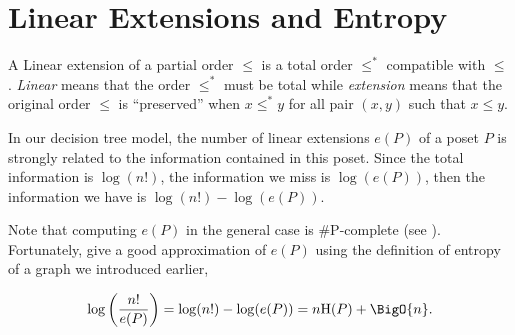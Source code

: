 \section{Linear Extensions and Entropy}

A Linear extension of a partial order $\leq$ is a total order $\leq^*$
compatible with $\leq$. \emph{Linear} means that the order $\leq^*$ must be
total while \emph{extension} means that the original order $\leq$ is
``preserved'' \ie when \(x \leq^* y\) for all pair \((x,y)\) such that \(x
\leq y\).

In our decision tree model, the number of linear extensions $e(P)$ of a poset
$P$ is strongly related to the information contained in this poset. Since the
total information is $\log(n!)$, the information we miss is $\log(e(P))$, then
the information we have is $\log(n!) - \log(e(P))$.


Note that computing $e(P)$ in the general case is \#P-complete
(see \citet*{brightwell1991counting}). Fortunately, \citet*{kahn:1995} give a good
approximation of $e(P)$ using the definition of entropy of a graph we
introduced earlier,

\begin{equation}
\log\left(\frac{n!}{e(P)}\right) = \log(n!) - \log(e(P)) = n \text{H}(P) +
\BigO{n}.
\label{eq:khankim1}
\end{equation}
